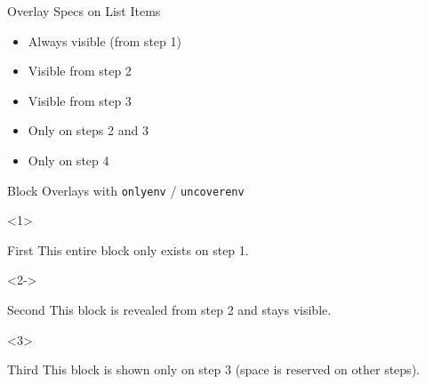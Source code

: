 \documentclass[aspectratio=169]{beamer}
\begin{document}

\begin{frame}{Overlay Specs on List Items}
  \begin{itemize}
    \item<1-> Always visible (from step 1)
    \item<2-> Visible from step 2
    \item<3-> Visible from step 3
    \item<2-3> Only on steps 2 and 3
    \item<4> Only on step 4
  \end{itemize}
\end{frame}


\begin{frame}{Block Overlays with \texttt{onlyenv} / \texttt{uncoverenv}}
  \begin{onlyenv}<1>
    \begin{block}{First}
      This entire block only exists on step 1.
    \end{block}
  \end{onlyenv}

  \begin{uncoverenv}<2->
    \begin{block}{Second}
      This block is revealed from step 2 and stays visible.
    \end{block}
  \end{uncoverenv}

  \begin{visibleenv}<3>
    \begin{alertblock}{Third}
      This block is shown only on step 3 (space is reserved on other steps).
    \end{alertblock}
  \end{visibleenv}
\end{frame}

\end{document}
